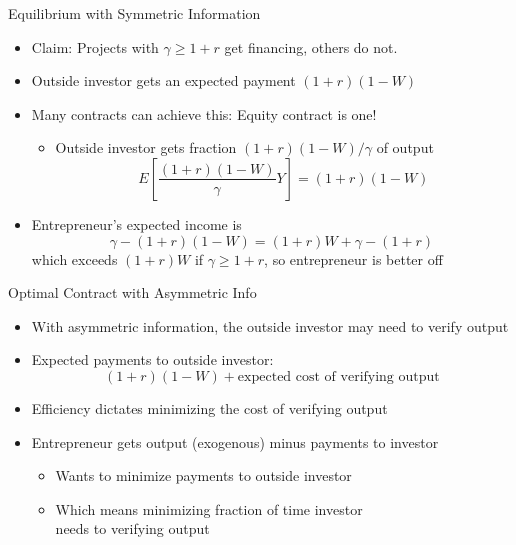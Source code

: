 \documentclass[11pt,aspectratio=169,xcolor={dvipsnames},hyperref={pdftex,pdfpagemode=UseNone,hidelinks,pdfdisplaydoctitle=true},usepdftitle=false]{beamer}
\begin{document}
\begin{frame}{Equilibrium with Symmetric Information}
\begin{itemize}
	\itemsep1em 
	\item Claim: Projects with $\gamma \geq 1+r$ get financing, others do not.
	\item Outside investor gets an expected payment $(1+r)(1-W)$ \pause 
	\item Many contracts can achieve this: Equity contract is one! \pause
	\begin{itemize}
		\item Outside investor gets fraction $(1+r)(1-W)/\gamma$ of output
		\[ E\left[\frac{(1+r)(1-W)}{\gamma}Y \right] = (1+r)(1-W) \]
	\end{itemize} \pause 
	\item Entrepreneur's expected income is 
	\[\gamma - (1+r)(1-W) = (1+r)W + \gamma - (1+r) \]
	which exceeds $(1+r)W$ if $\gamma \geq 1+r$, so entrepreneur is better off
\end{itemize}
\end{frame}


\begin{frame}{Optimal Contract with Asymmetric Info}
\begin{itemize}
	\itemsep1em 
\item With asymmetric information, the outside investor may need to verify output
	\item Expected payments to outside investor:
	\[ (1+r)(1-W) + \text{expected cost of verifying output} \]
	\item Efficiency dictates minimizing the cost of verifying output
	\item Entrepreneur gets output (exogenous) minus payments to investor
	\begin{itemize}
		\item Wants to minimize payments to outside investor
		\item Which means minimizing fraction of time investor \\ needs to verifying output
	\end{itemize}
\end{itemize}
\end{frame}
\end{document}
